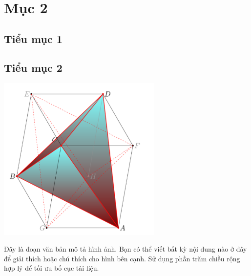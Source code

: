 \section{Mục 2}
\subsection{Tiểu mục 1}

\subsection{Tiểu mục 2}

\noindent %
\begin{minipage}{0.4\textwidth} %
    \centering
    \includegraphics[width=\textwidth]{../../assets/images/figure-1.png} %
    \label{fig:image}
\end{minipage}%
\hfill %
\begin{minipage}{0.55\textwidth} %
    Đây là đoạn văn bản mô tả hình ảnh. Bạn có thể viết bất kỳ nội dung nào ở đây để giải thích hoặc chú thích cho hình bên cạnh. Sử dụng phần trăm chiều rộng hợp lý để tối ưu bố cục tài liệu.
\end{minipage}
